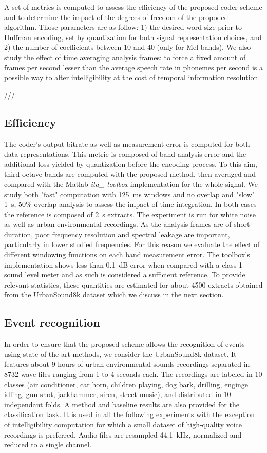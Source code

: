\documentclass[final,3p,times,twocolumn]{elsarticle}
\begin{document}
A set of metrics is computed to assess the efficiency of the proposed coder scheme and to determine the impact of the degrees of freedom of the propoded algorithm. Those parameters are as follow: 1) the desired word size prior to Huffman encoding, set by quantization for both signal representation choices, and 2) the number of coefficients between 10 and 40 (only for Mel bands). We also study the effect of time averaging analysis frames: to force a fixed amount of frames per second lesser than the average speech rate in phonemes per second is a possible way to alter intelligibility at the cost of temporal information resolution.

///

\subsection{Efficiency}

The coder's output bitrate as well as measurement error is computed for both data representations. This metric is composed of band analysis error and the additional loss yielded by quantization before the encoding process. To this aim, third-octave bands are computed with the proposed method, then averaged and compared with the Matlab \textit{ita\_ toolbox}\cite{itatoolbox2017} implementation for the whole signal. We study both "fast" computation with 125~ms windows and no overlap and "slow" 1~s, 50\% overlap analysis to assess the impact of time integration. In both cases the reference is composed of 2~s extracts. The experiment is run for white noise as well as urban environmental recordings. As the analysis frames are of short duration, poor frequency resolution and spectral leakage are important, particularly in lower studied frequencies. For this reason we evaluate the effect of different windowing functions on each band measurement error. The toolbox's implementation shows less than 0.1~dB error when compared with a class 1 sound level meter and as such is considered a sufficient reference. To provide relevant statistics, these quantities are estimated for about 4500 extracts obtained from the UrbanSound8k dataset which we discuss in the next section.


\subsection{Event recognition}

In order to ensure that the proposed scheme allows the recognition of events using state of the art methods, we consider the UrbanSound8k dataset\cite{salamon2014}. It features about 9 hours of urban environmental sounds recordings separated in 8732 wave files ranging from 1 to 4 seconds each. The recordings are labeled in 10 classes (air conditioner, car horn, children playing, dog bark, drilling, enginge idling, gun shot, jackhammer, siren, street music), and distributed in 10 independant folds. A method and baseline results are also provided for the classification task. It is used in all the following experiments with the exception of intelligibility computation for which a small dataset of high-quality voice recordings is preferred. Audio files are resampled 44.1~kHz, normalized and reduced to a single channel.
\end{document}
